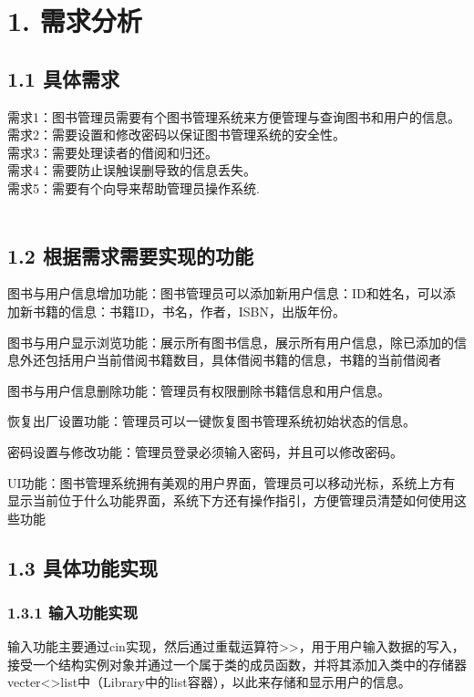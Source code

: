 \documentclass{article}
\begin{document}
\section*{1. 需求分析}

\subsection*{1.1 具体需求}
\noindent
需求1：图书管理员需要有个图书管理系统来方便管理与查询图书和用户的信息。\\
需求2：需要设置和修改密码以保证图书管理系统的安全性。\\
需求3：需要处理读者的借阅和归还。\\
需求4：需要防止误触误删导致的信息丢失。\\
需求5：需要有个向导来帮助管理员操作系统.\\\\

\subsection*{1.2 根据需求需要实现的功能}
图书与用户信息增加功能：图书管理员可以添加新用户信息：ID和姓名，可以添加新书籍的信息：书籍ID，书名，作者，ISBN，出版年份。

图书与用户显示浏览功能：展示所有图书信息，展示所有用户信息，除已添加的信息外还包括用户当前借阅书籍数目，具体借阅书籍的信息，书籍的当前借阅者

图书与用户信息删除功能：管理员有权限删除书籍信息和用户信息。

恢复出厂设置功能：管理员可以一键恢复图书管理系统初始状态的信息。

密码设置与修改功能：管理员登录必须输入密码，并且可以修改密码。

UI功能：图书管理系统拥有美观的用户界面，管理员可以移动光标，系统上方有显示当前位于什么功能界面，系统下方还有操作指引，方便管理员清楚如何使用这些功能\\
\subsection*{1.3 具体功能实现}
\subsubsection*{1.3.1 输入功能实现}
输入功能主要通过cin实现，然后通过重载运算符>>，用于用户输入数据的写入，接受一个结构实例对象并通过一个属于类的成员函数，并将其添加入类中的存储器vecter<>list中（Library中的list容器），以此来存储和显示用户的信息。\\
\end{document}
